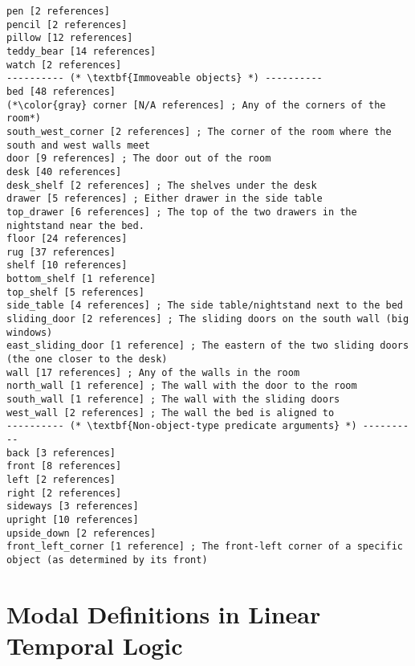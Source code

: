 \documentclass{article}
\begin{document}
\begin{lstlisting}
pen [2 references] 
pencil [2 references] 
pillow [12 references] 
teddy_bear [14 references] 
watch [2 references] 
---------- (* \textbf{Immoveable objects} *) ----------
bed [48 references] 
(*\color{gray} corner [N/A references] ; Any of the corners of the room*)
south_west_corner [2 references] ; The corner of the room where the south and west walls meet
door [9 references] ; The door out of the room
desk [40 references] 
desk_shelf [2 references] ; The shelves under the desk
drawer [5 references] ; Either drawer in the side table
top_drawer [6 references] ; The top of the two drawers in the nightstand near the bed.
floor [24 references] 
rug [37 references] 
shelf [10 references] 
bottom_shelf [1 reference] 
top_shelf [5 references] 
side_table [4 references] ; The side table/nightstand next to the bed
sliding_door [2 references] ; The sliding doors on the south wall (big windows)
east_sliding_door [1 reference] ; The eastern of the two sliding doors (the one closer to the desk)
wall [17 references] ; Any of the walls in the room
north_wall [1 reference] ; The wall with the door to the room
south_wall [1 reference] ; The wall with the sliding doors
west_wall [2 references] ; The wall the bed is aligned to
---------- (* \textbf{Non-object-type predicate arguments} *) ----------
back [3 references] 
front [8 references] 
left [2 references] 
right [2 references] 
sideways [3 references] 
upright [10 references] 
upside_down [2 references] 
front_left_corner [1 reference] ; The front-left corner of a specific object (as determined by its front)
\end{lstlisting}




\section{Modal Definitions in Linear Temporal Logic}
\end{document}
